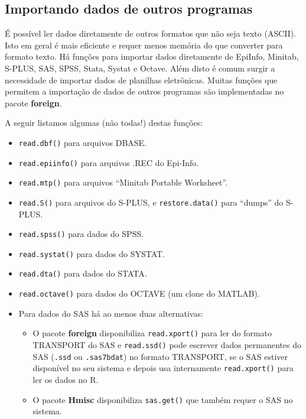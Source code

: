 \documentclass[
  10pt,
  a4paper]{book}
\providecommand{\tightlist}{%
  \setlength{\itemsep}{0pt}\setlength{\parskip}{0pt}}
\begin{document}
\hypertarget{importando-dados-de-outros-programas}{%
\subsection{Importando dados de outros programas}\label{importando-dados-de-outros-programas}}

É possível ler dados diretamente de outros formatos que não seja texto
(ASCII). Isto em geral é mais eficiente e requer menos memória do que
converter para formato texto. Há funções para importar dados diretamente
de EpiInfo, Minitab, S-PLUS, SAS, SPSS, Stata, Systat e Octave. Além
disto é comum surgir a necessidade de importar dados de planilhas
eletrônicas. Muitas funções que permitem a importação de dados de outros
programas são implementadas no pacote \textbf{foreign}.

A seguir listamos algumas (não todas!) destas funções:

\begin{itemize}
\tightlist
\item
  \texttt{read.dbf()} para arquivos DBASE.
\item
  \texttt{read.epiinfo()} para arquivos .REC do Epi-Info.
\item
  \texttt{read.mtp()} para arquivos ``Minitab Portable Worksheet''.
\item
  \texttt{read.S()} para arquivos do S-PLUS, e \texttt{restore.data()} para ``dumps'' do
  S-PLUS.
\item
  \texttt{read.spss()} para dados do SPSS.
\item
  \texttt{read.systat()} para dados do SYSTAT.
\item
  \texttt{read.dta()} para dados do STATA.
\item
  \texttt{read.octave()} para dados do OCTAVE (um clone do MATLAB).
\item
  Para dados do SAS há ao menos duas alternativas:

  \begin{itemize}
  \tightlist
  \item
    O pacote \textbf{foreign} disponibiliza \texttt{read.xport()} para ler do
    formato TRANSPORT do SAS e \texttt{read.ssd()} pode escrever dados
    permanentes do SAS (\texttt{.ssd} ou \texttt{.sas7bdat}) no formato TRANSPORT, se
    o SAS estiver disponível no seu sistema e depois usa internamente
    \texttt{read.xport()} para ler os dados no R.
  \item
    O pacote \textbf{Hmisc} disponibiliza \texttt{sas.get()} que também requer o
    SAS no sistema.
  \end{itemize}
\end{itemize}
\end{document}
